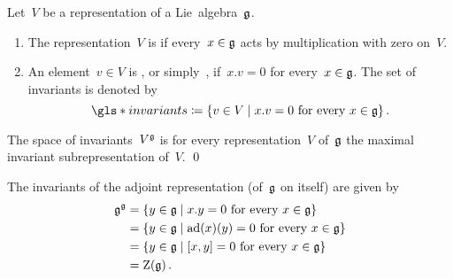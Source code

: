 \begin{definition}
  \label{trivial representations}
  Let~$V$ be a representation of a Lie~algebra~$\mathfrak{g}$.
  \begin{enumerate}
    \item
      The representation~$V$ is  if every~$x \in \mathfrak{g}$ acts by multiplication with zero on~$V$.
    \item
      An element~$v \in V$ is , or simply~, if~$x.v = 0$ for every~$x \in \mathfrak{g}$.
      The set of invariants is denoted by
      \[
        \gls*{invariants}
        \defined
        \{
          v \in V
        \suchthat
          \text{$x.v = 0$ for every~$x \in \glie$}
        \}  \,.
      \]
  \end{enumerate}  
\end{definition}




\begin{lemma}
  The space of invariants~$V^{\mathfrak{g}}$ is for every representation~$V$ of~$\mathfrak{g}$ the maximal invariant subrepresentation of~$V$.
  \qed
\end{lemma}


\begin{example}
  The invariants of the adjoint representation (of~$\mathfrak{g}$ on itself) are given by
  \begin{align*}
    \glie^{\glie}
    &=
    \{
      y \in \glie
    \suchthat
      \text{$x.y = 0$ for every~$x \in \glie$}
    \}
    \\
    &=
    \{
      y \in \glie
    \suchthat
      \text{$\ad(x)(y) = 0$ for every~$x \in \glie$}
    \}
    \\
    &=
    \{
      y \in \glie
    \suchthat
      \text{$[x,y] = 0$ for every~$x \in \glie$}
    \}
    \\
    &=
    \centerlie(\glie) \,.
  \end{align*}
\end{example}


